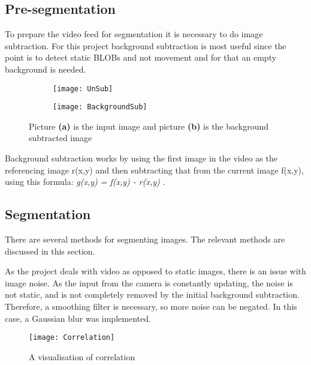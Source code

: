 \subsection{Pre-segmentation}
To prepare the video feed for segmentation it is necessary to do image subtraction. For this project background subtraction is most useful since the point is to detect static BLOBs and not movement and for that an empty background is needed. 

\begin{figure}
	\centering
	\begin{subfigure}[b]{0.3\textwidth}
	\texttt{[image: UnSub]}
		\caption{\label{Fig:UnSub}}
	\end{subfigure}
	\begin{subfigure}[b]{0.3\textwidth}
	\texttt{[image: BackgroundSub]}
		\caption{\label{Fig:BackgroundSub}}
	\end{subfigure}
	\caption{Picture \textbf{(a)} is the input image and picture \textbf{(b)} is the background subtracted image\label{Fig:Subtract}}
\end{figure}

Background subtraction works by using the first image in the video as the referencing image r(x,y) and then subtracting that from the current image f(x,y), using this formula: \textit{g(x,y) = f(x,y) - r(x,y)} \citep{moeslund_introduction_2012}. 

\subsection{Segmentation}
There are several methods for segmenting images. The relevant methods are discussed in this section. 

As the project deals with video as opposed to static images, there is an issue with image noise. As the input from the camera is constantly updating, the noise is not static, and is not completely removed by the initial background subtraction. Therefore, a smoothing filter is necessary, so more noise can be negated. In this case, a Gaussian blur was implemented.

\begin{wrapfigure}{r}{0.32\textwidth}
  \begin{center}
    \texttt{[image: Correlation]}
  \end{center}
  \caption{A visualisation of correlation \label{Fig:Correlation}\citep{moeslund_introduction_2012}}
\end{wrapfigure}

